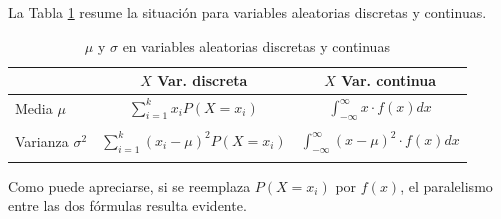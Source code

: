     \begin{center}
    \end{center}
La Tabla \ref{cap05:tablas:MuSigmaFormulasDosTiposVariables} resume la situación para variables aleatorias discretas y continuas.
\begin{table}[h]
    \begin{center}
    \begin{tabular}{|l|c|c|}
    \hline
                        & $X$ Var. discreta& $X$ Var. continua                                                                            \\
    \hline
    Media $\mu$\rule{0cm}{1cm}& $\displaystyle\sum_{i=1}^k x_iP(X=x_i)$         & $\displaystyle \int_{-\infty}^{\infty} x\cdot f(x)dx$         \\
    &&\\
    \hline
    Varianza $\sigma^2$ \rule{0cm}{1cm}& $\displaystyle\sum_{i=1}^k (x_i-\mu)^2P(X=x_i)$ & $\displaystyle \int_{-\infty}^{\infty} (x-\mu)^2\cdot f(x)dx$ \\
    &&\\
    \hline
    \end{tabular}
    \end{center}
\caption{$\mu$ y $\sigma$ en variables aleatorias discretas y continuas}
\label{cap05:tablas:MuSigmaFormulasDosTiposVariables}
\end{table}

Como puede apreciarse, si se reemplaza $P(X=x_i)$ por $f(x)$, el paralelismo entre las dos fórmulas resulta evidente.

